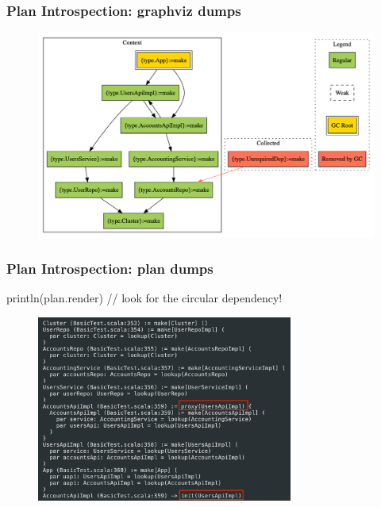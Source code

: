 \documentclass[usenames,dvipsnames]{beamer}
\begin{document}
\begin{frame}
  \frametitle{Plan Introspection: graphviz dumps\footnotemark[1]}
  \begin{figure}
    \includegraphics[width=\textwidth]{media/plan-example-dot}
  \end{figure}
\end{frame}

\begin{frame}[fragile]
\frametitle{Plan Introspection: plan dumps}
\begin{scalacode}
println(plan.render) // look for the circular dependency!
\end{scalacode}

\begin{figure}
    \includegraphics[width=0.75\textwidth]{media/plan-example.png}
\end{figure}
\end{frame}
\end{document}
